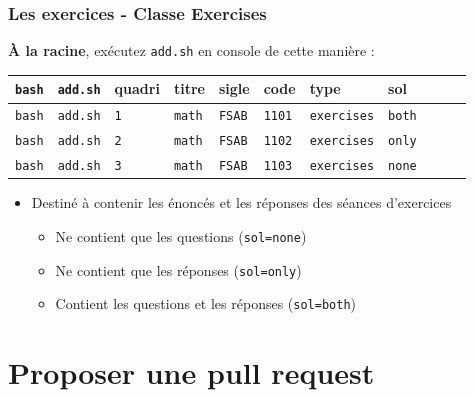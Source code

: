 \documentclass{beamer}
\begin{document}
\begin{frame}
    \frametitle{Les exercices - Classe Exercises}
    \begin{exampleblock}{\textbf{À la racine}, exécutez \lstinline|add.sh| en
    console de cette manière :}
       \begin{tabular}{lllllllllll}
           \lstinline|bash| & \lstinline|add.sh| & quadri & titre & sigle & code & type & sol \\
           \hline
	   \lstinline|bash| & \lstinline|add.sh| & \lstinline|1| & \lstinline|math| & \lstinline|FSAB| & \lstinline|1101| & \lstinline|exercises| & \lstinline|both| \\
	   \lstinline|bash| & \lstinline|add.sh| & \lstinline|2| & \lstinline|math| & \lstinline|FSAB| & \lstinline|1102| & \lstinline|exercises| & \lstinline|only| \\
	   \lstinline|bash| & \lstinline|add.sh| & \lstinline|3| & \lstinline|math| & \lstinline|FSAB| & \lstinline|1103| & \lstinline|exercises| & \lstinline|none| \\
       \end{tabular}
   \end{exampleblock}
   \begin{itemize}
       \item Destiné à contenir les énoncés et les réponses des séances
           d'exercices
           \begin{itemize}
               \item Ne contient que les questions (\lstinline|sol=none|)
               \item Ne contient que les réponses (\lstinline|sol=only|)
               \item Contient les questions et les réponses (\lstinline|sol=both|)
       \end{itemize}
   \end{itemize}

\end{frame}

\section{Proposer une pull request}
\end{document}
